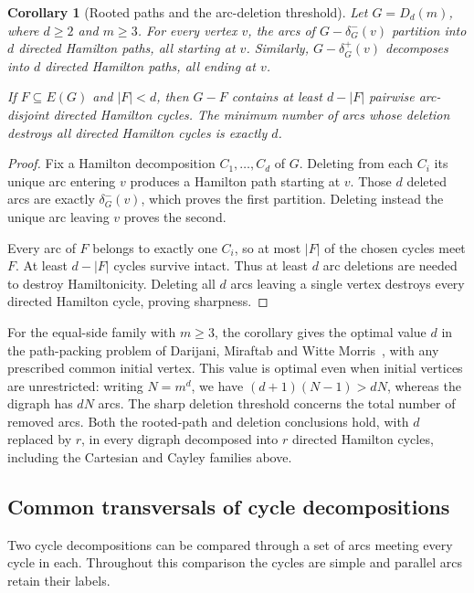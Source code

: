 \documentclass[11pt,reqno]{amsart}
\numberwithin{equation}{section}
\newtheorem{corollary}[theorem]{Corollary}
\theoremstyle{definition}
\theoremstyle{remark}
\begin{document}
\begin{corollary}[Rooted paths and the arc-deletion threshold]\label{cor:packing-resilience}
Let $G=D_d(m)$, where $d\ge2$ and $m\ge3$. For every vertex $v$, the arcs of
$G-\delta_G^-(v)$ partition into $d$ directed Hamilton paths, all starting at
$v$. Similarly, $G-\delta_G^+(v)$ decomposes into $d$ directed Hamilton paths,
all ending at $v$.

If $F\subseteq E(G)$ and $|F|<d$, then $G-F$ contains at least $d-|F|$
pairwise arc-disjoint directed Hamilton cycles. The minimum number of arcs
whose deletion destroys all directed Hamilton cycles is exactly $d$.
\end{corollary}
\begin{proof}
Fix a Hamilton decomposition $C_1,\ldots,C_d$ of $G$. Deleting from each $C_i$
its unique arc entering $v$ produces a Hamilton path starting at $v$. Those
$d$ deleted arcs are exactly $\delta_G^-(v)$, which proves the first partition.
Deleting instead the unique arc leaving $v$ proves the second.

Every arc of $F$ belongs to exactly one $C_i$, so at most $|F|$ of the chosen
cycles meet $F$. At least $d-|F|$ cycles survive intact. Thus at least $d$
arc deletions are needed to destroy Hamiltonicity. Deleting all $d$ arcs
leaving a single vertex destroys every directed Hamilton cycle, proving
sharpness.
\end{proof}

For the equal-side family with $m\ge3$, the corollary gives the optimal
value $d$ in the path-packing problem of Darijani, Miraftab and Witte
Morris~\cite[Question~1.2]{DMM22}, with any prescribed common initial
vertex. This value is optimal even when initial vertices are unrestricted:
writing $N=m^d$, we have $(d+1)(N-1)>dN$, whereas the digraph has $dN$ arcs.
The sharp deletion threshold concerns the total number of removed arcs.
Both the rooted-path and deletion conclusions hold, with $d$ replaced by
$r$, in every digraph decomposed into $r$ directed Hamilton cycles,
including the Cartesian and Cayley families above.

\subsection{Common transversals of cycle decompositions}
Two cycle decompositions can be compared through a set of arcs meeting every
cycle in each. Throughout this comparison the cycles are simple and
parallel arcs retain their labels.
\end{document}
